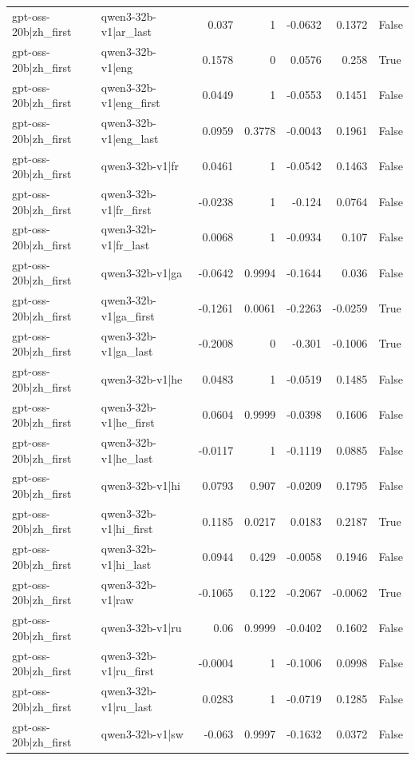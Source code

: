 \begin{table}
\begin{tabular}{l l r r r r l}
gpt-oss-20b|zh_first & qwen3-32b-v1|ar_last & 0.037 & 1 & -0.0632 & 0.1372 & False \\
gpt-oss-20b|zh_first & qwen3-32b-v1|eng & 0.1578 & 0 & 0.0576 & 0.258 & True \\
gpt-oss-20b|zh_first & qwen3-32b-v1|eng_first & 0.0449 & 1 & -0.0553 & 0.1451 & False \\
gpt-oss-20b|zh_first & qwen3-32b-v1|eng_last & 0.0959 & 0.3778 & -0.0043 & 0.1961 & False \\
gpt-oss-20b|zh_first & qwen3-32b-v1|fr & 0.0461 & 1 & -0.0542 & 0.1463 & False \\
gpt-oss-20b|zh_first & qwen3-32b-v1|fr_first & -0.0238 & 1 & -0.124 & 0.0764 & False \\
gpt-oss-20b|zh_first & qwen3-32b-v1|fr_last & 0.0068 & 1 & -0.0934 & 0.107 & False \\
gpt-oss-20b|zh_first & qwen3-32b-v1|ga & -0.0642 & 0.9994 & -0.1644 & 0.036 & False \\
gpt-oss-20b|zh_first & qwen3-32b-v1|ga_first & -0.1261 & 0.0061 & -0.2263 & -0.0259 & True \\
gpt-oss-20b|zh_first & qwen3-32b-v1|ga_last & -0.2008 & 0 & -0.301 & -0.1006 & True \\
gpt-oss-20b|zh_first & qwen3-32b-v1|he & 0.0483 & 1 & -0.0519 & 0.1485 & False \\
gpt-oss-20b|zh_first & qwen3-32b-v1|he_first & 0.0604 & 0.9999 & -0.0398 & 0.1606 & False \\
gpt-oss-20b|zh_first & qwen3-32b-v1|he_last & -0.0117 & 1 & -0.1119 & 0.0885 & False \\
gpt-oss-20b|zh_first & qwen3-32b-v1|hi & 0.0793 & 0.907 & -0.0209 & 0.1795 & False \\
gpt-oss-20b|zh_first & qwen3-32b-v1|hi_first & 0.1185 & 0.0217 & 0.0183 & 0.2187 & True \\
gpt-oss-20b|zh_first & qwen3-32b-v1|hi_last & 0.0944 & 0.429 & -0.0058 & 0.1946 & False \\
gpt-oss-20b|zh_first & qwen3-32b-v1|raw & -0.1065 & 0.122 & -0.2067 & -0.0062 & True \\
gpt-oss-20b|zh_first & qwen3-32b-v1|ru & 0.06 & 0.9999 & -0.0402 & 0.1602 & False \\
gpt-oss-20b|zh_first & qwen3-32b-v1|ru_first & -0.0004 & 1 & -0.1006 & 0.0998 & False \\
gpt-oss-20b|zh_first & qwen3-32b-v1|ru_last & 0.0283 & 1 & -0.0719 & 0.1285 & False \\
gpt-oss-20b|zh_first & qwen3-32b-v1|sw & -0.063 & 0.9997 & -0.1632 & 0.0372 & False \\

\end{tabular}
\end{table}
